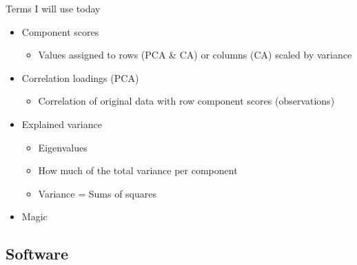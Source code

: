 \documentclass[
  ignorenonframetext,
]{beamer}
\providecommand{\tightlist}{%
  \setlength{\itemsep}{0pt}\setlength{\parskip}{0pt}}
\begin{document}
\begin{frame}{Terms I will use today}
\protect\hypertarget{terms-i-will-use-today}{}

\begin{itemize}[<+->]
\tightlist
\item
  Component scores

  \begin{itemize}[<+->]
  \tightlist
  \item
    Values assigned to rows (PCA \& CA) or columns (CA) scaled by
    variance
  \end{itemize}
\item
  Correlation loadings (PCA)

  \begin{itemize}[<+->]
  \tightlist
  \item
    Correlation of original data with row component scores
    (observations)
  \end{itemize}
\item
  Explained variance

  \begin{itemize}[<+->]
  \tightlist
  \item
    Eigenvalues
  \item
    How much of the total variance per component
  \item
    Variance = Sums of squares
  \end{itemize}
\item
  Magic
\end{itemize}

\end{frame}

\hypertarget{software}{%
\subsection{Software}\label{software}}
\end{document}
